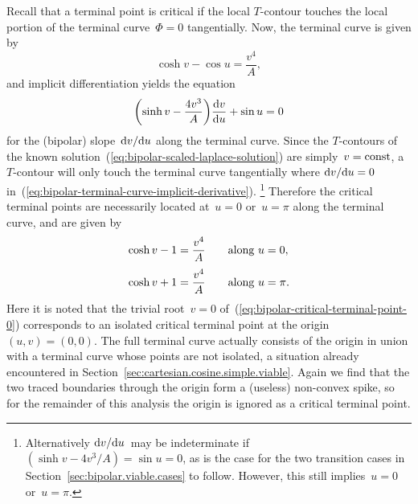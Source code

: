 Recall that a terminal point is critical
if the local $T$-contour touches
the local portion of the terminal curve~$\Phi = 0$ tangentially.
Now, the terminal curve is given by
\begin{equation}
  \cosh v - \cos u = \frac{v^4}{A},
  \label{eq:bipolar-terminal-curve}
\end{equation}
and implicit differentiation yields the equation
\begin{equation}
  \roundbr*{\sinh v - \frac{4 v^3}{A}} \tder{v}{u} + \sin u = 0
  \label{eq:bipolar-terminal-curve-implicit-derivative}
\end{equation}
for the (bipolar) slope~$\mathop{}\!\mathrm{d} v / {\mathop{}\!\mathrm{d} u}$
along the terminal curve.
Since the $T$-contours
of the known solution~(\ref{eq:bipolar-scaled-laplace-solution})
are simply~$v = \mathrm{const}$,
a $T$-contour will only touch the terminal curve tangentially
where $\mathop{}\!\mathrm{d} v / {\mathop{}\!\mathrm{d} u} = 0$
in~(\ref{eq:bipolar-terminal-curve-implicit-derivative}).%
\footnote{
  Alternatively $\mathop{}\!\mathrm{d} v / {\mathop{}\!\mathrm{d} u}$~may be indeterminate
  if~$(\sinh v - 4 v^3 / A) = \sin u = 0$,
  as is the case for the two transition cases
  in Section~\ref{sec:bipolar.viable.cases} to follow.
  However, this still implies~$u = 0$ or~$u = \pi$.
}
Therefore the critical terminal points are necessarily located
at~$u = 0$ or~$u = \pi$ along the terminal curve,
and are given by
\begin{align}
  \cosh v - 1 &= \frac{v^4}{A} \eqnspace \text{along~$u = 0$},
  \label{eq:bipolar-critical-terminal-point-0}
    \\[\tallspace]
  \cosh v + 1 &= \frac{v^4}{A} \eqnspace \text{along~$u = \pi$}.
  \label{eq:bipolar-critical-terminal-point-pi}
\end{align}
Here it is noted that the trivial root~$v = 0$
of~(\ref{eq:bipolar-critical-terminal-point-0})
corresponds to an isolated critical terminal point
at the origin~$(u, v) = (0, 0)$.
The full terminal curve actually consists of the origin
in union with a  terminal curve
whose points are not isolated,
a situation already encountered
in Section~\ref{sec:cartesian.cosine.simple.viable}.
Again we find that the two traced boundaries through the origin
form a (useless) non-convex spike,
so for the remainder of this analysis
the origin is ignored as a critical terminal point.

